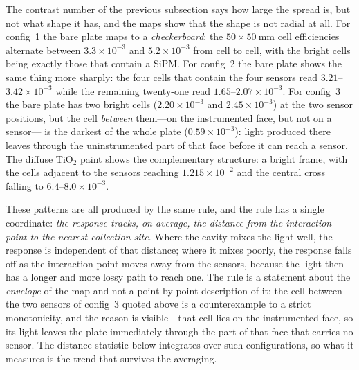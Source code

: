 \documentclass[11pt,a4paper]{article}
\begin{document}
The contrast number of the previous subsection says how large the spread is,
but not what shape it has, and the maps show that the shape is not radial at
all. For config~1 the bare plate maps to a \emph{checkerboard}: the
$50\times\SI{50}{\milli\meter}$ cell efficiencies alternate between
$3.3\times10^{-3}$ and $5.2\times10^{-3}$ from cell to cell, with the bright
cells being exactly those that contain a SiPM. For config~2 the bare plate
shows the same thing more sharply: the four cells that contain the four sensors
read $3.21$--$3.42\times10^{-3}$ while the remaining twenty-one read
$1.65$--$2.07\times10^{-3}$. For config~3 the bare plate has two bright cells
($2.20\times10^{-3}$ and $2.45\times10^{-3}$) at the two sensor positions, but
the cell \emph{between} them---on the instrumented face, but not on a sensor---
is the darkest of the whole plate ($0.59\times10^{-3}$): light produced there
leaves through the uninstrumented part of that face before it can reach a
sensor. The diffuse TiO$_2$ paint shows
the complementary structure: a bright frame, with the cells adjacent to the
sensors reaching $1.215\times10^{-2}$ and the central cross falling to
$6.4$--$8.0\times10^{-3}$.

These patterns are all produced by the same rule, and the rule has a single
coordinate: \emph{the response tracks, on average, the distance from the
interaction point to the nearest collection site}. Where the cavity mixes the
light well, the response is independent of that distance; where it mixes
poorly, the response falls off as the interaction point moves away from the
sensors, because the light then has a longer and more lossy path to reach one.
The rule is a statement about the \emph{envelope} of the map and not a
point-by-point description of it: the cell between the two sensors of config~3
quoted above is a counterexample to a strict monotonicity, and the reason is
visible---that cell lies on the instrumented face, so its light leaves the
plate immediately through the part of that face that carries no sensor. The
distance statistic below integrates over such configurations, so what it
measures is the trend that survives the averaging.
\end{document}

